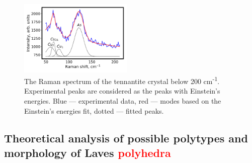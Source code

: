\documentclass[preprint,review,12pt]{elsarticle}
\begin{document}
\begin{table}
\caption{\label{tab:ram_fit}
Initial and fitted Einstein's energies. Initial energies are Einstein's energies from structural study.}
\centering
{}
\end{table}

\begin{figure}
\centering
\includegraphics[width=0.48\textwidth]{raman_25_CuAsS3_low_energy}
\caption{\label{fig:low_energ_raman} The Raman spectrum of the tennantite crystal  below 200 cm\textsuperscript{-1}. Experimental peaks are considered as the peaks with Einstein's energies. Blue --- experimental data, red --- modes based on the Einstein's energies fit, dotted --- fitted peaks.}
\end{figure}

\subsection{Theoretical analysis of possible polytypes and morphology of Laves \textcolor{red}{polyhedra} }\label{sec:level2}
\end{document}
